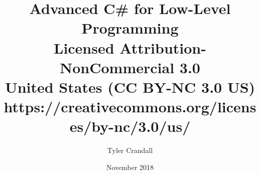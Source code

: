 \documentclass{book}
\begin{document}
\author{Tyler Crandall}
\title{Advanced C\# for Low-Level Programming\\
	   \large Licensed Attribution-NonCommercial 3.0 
	   \\United States (CC BY-NC 3.0 US) \\
   	   \small https://creativecommons.org/licenses/by-nc/3.0/us/}
\date{November 2018}

\frontmatter

\maketitle
\newpage

\tableofcontents

\mainmatter








\backmatter
\end{document}
